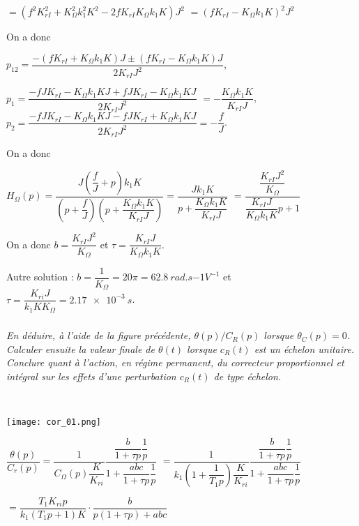 \begin{multicols}{2}
\begin{corrige}
$=\left(f^2 K_{rI}^2+K_{\Omega}^2k_{1}^2K^2-2f K_{rI}K_{\Omega}k_{1}K\right)J^2  $
$=\left(f K_{rI}-K_{\Omega}k_{1}K\right)^2J^2  $

On a donc 

$p_{12} = \dfrac{-\left(f K_{rI}+K_{\Omega}k_{1}K\right)J \pm \left(f K_{rI}-K_{\Omega}k_{1}K\right)J}{2 K_{rI}J^2}$, 

$p_{1} = \dfrac{-fJ K_{rI}-K_{\Omega}k_{1}KJ + fJ K_{rI}-K_{\Omega}k_{1}KJ}{2 K_{rI}J^2}$
$= -\dfrac{K_{\Omega}k_{1}K }{ K_{rI}J}$, 
$p_{2} = \dfrac{-fJ K_{rI}-K_{\Omega}k_{1}KJ -fJ K_{rI}+K_{\Omega}k_{1}KJ}{2 K_{rI}J^2}= -\dfrac{f }{J}$.

On a donc 

$H_{\Omega}(p)=\dfrac{J\left( \dfrac{f}{J} + p \right)k_{1}K}{\left(p+\dfrac{f }{J} \right)\left(p+\dfrac{K_{\Omega}k_{1}K }{ K_{rI}J} \right)}=\dfrac{Jk_{1}K}{p+\dfrac{K_{\Omega}k_{1}K }{ K_{rI}J} }$
$=\dfrac{\dfrac{ K_{rI}J^2}{K_{\Omega} } }{\dfrac{ K_{rI}J}{K_{\Omega}k_{1}K }p+1 }$

On a donc $b=\dfrac{ K_{rI}J^2}{K_{\Omega} }$ et $\tau =\dfrac{ K_{rI}J}{K_{\Omega}k_{1}K }$.

\normalsize
Autre solution : $b=\dfrac{1}{K_{\Omega}} = 20 \pi = \SI{62,8}{rad.s{-1}V^{-1}}$ et $\tau=\dfrac{K_{ri}J}{k_1KK_{\Omega}}=\SI{2,17e-3}{s}$.


\end{corrige}
\else
\fi

\subparagraph{}\textit{En déduire, à l'aide de la figure précédente, $\theta(p)/C_R(p)$
  lorsque $\theta_C(p)=0$. Calculer ensuite la valeur finale
  de $\theta(t)$ lorsque $c_R(t)$ est un échelon unitaire. %
  Conclure quant à l'action, en régime permanent, du correcteur
  proportionnel et intégral sur les effets d'une perturbation
  $c_R(t)$ de type échelon.}

\ifprof
\begin{corrige}~\\

\begin{center}
\texttt{[image: cor\_01.png]}
\end{center}

$\dfrac{\theta(p)}{C_r(p)}=\dfrac{1}{C_{\Omega}(p)\dfrac{K}{K_{ri}}}\dfrac{\dfrac{b}{1+\tau p}\dfrac{1}{p}}{1+\dfrac{abc}{1+\tau p}\dfrac{1}{p}}$ 
$=\dfrac{1}{ k_{1}\left( 1 + \dfrac{1}{T_{1}p} \right)\dfrac{K}{K_{ri}}}\dfrac{\dfrac{b}{1+\tau p}\dfrac{1}{p}}{1+\dfrac{abc}{1+\tau p}\dfrac{1}{p}}$

$=\dfrac{T_{1}K_{ri}p}{ k_{1}\left( T_{1}p + 1 \right)K}\cdot \dfrac{b}{p\left(1+\tau p \right)+abc}$


\end{corrige}
\end{multicols}
